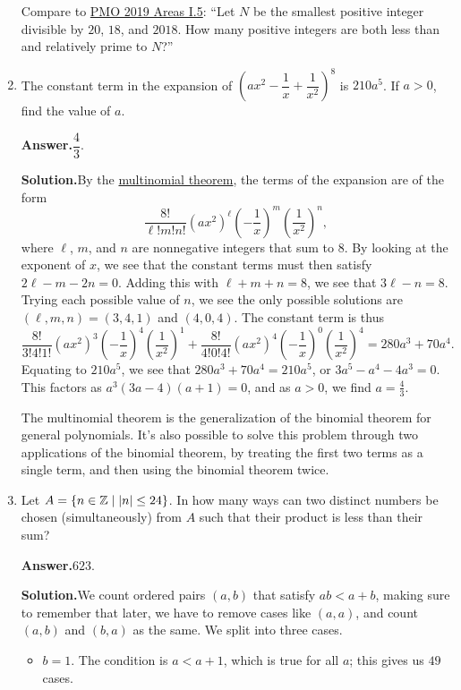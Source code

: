 \documentclass[11pt,paper=letter]{scrartcl}
\newcommand{\ans}{{\sffamily \bfseries Answer.}\;}
\newcommand{\sol}{{\sffamily \bfseries Solution.}\;}
\newcommand{\rem}[1]{{\small \sffamily \sansmath {\bfseries Remark.} #1}}
\begin{document}
\begin{enumerate}[left=0pt]
\rem{Compare to \href{https://cjquines.com/files/pmo2019areas.pdf}{PMO 2019 Areas I.5{}}: ``Let $N$ be the smallest positive integer divisible by $20$, $18$, and $2018$. How many positive integers are both less than and relatively prime to $N$?''}

\item The constant term in the expansion of $\left(ax^2 - \dfrac{1}{x} + \dfrac{1}{x^2}\right)^8$ is $210a^5$. If $a > 0$, find the value of $a$.

\ans $\boxed{\dfrac{4}{3}}$.

\sol By the \href{https://en.wikipedia.org/wiki/Multinomial_theorem}{multinomial theorem{}}, the terms of the expansion are of the form
\[
  \frac{8!}{\ell!m!n!}(ax^2)^\ell\left(-\frac{1}{x}\right)^m\left(\frac{1}{x^2}\right)^n,
\]
where $\ell$, $m$, and $n$ are nonnegative integers that sum to $8$. By looking at the exponent of $x$, we see that the constant terms must then satisfy $2\ell - m - 2n = 0$. Adding this with $\ell + m + n = 8$, we see that $3\ell - n = 8$. Trying each possible value of $n$, we see the only possible solutions are $(\ell, m, n) = (3, 4, 1)$ and $(4, 0, 4)$. The constant term is thus
\[
  \frac{8!}{3!4!1!}(ax^2)^3\left(-\frac{1}{x}\right)^4\left(\frac{1}{x^2}\right)^1 + \frac{8!}{4!0!4!}(ax^2)^4\left(-\frac{1}{x}\right)^0\left(\frac{1}{x^2}\right)^4 = 280a^3 + 70a^4.
\]
Equating to $210a^5$, we see that $280a^3 + 70a^4 = 210a^5$, or $3a^5 - a^4 - 4a^3 =0$. This factors as $a^3(3a - 4)(a + 1) = 0$, and as $a > 0$, we find $a = \frac{4}{3}$.

\rem{The multinomial theorem is the generalization of the binomial theorem for general polynomials. It's also possible to solve this problem through two applications of the binomial theorem, by treating the first two terms as a single term, and then using the binomial theorem twice.}

\item Let $A = \{n \in \mathbb Z \mid \left\lvert n \right\rvert \le 24\}$. In how many ways can two distinct numbers be chosen (simultaneously) from $A$ such that their product is less than their sum?

\ans $\boxed{623}$.

\sol We count ordered pairs $(a, b)$ that satisfy $ab < a + b$, making sure to remember that later, we have to remove cases like $(a, a)$, and count $(a, b)$ and $(b, a)$ as the same. We split into three cases.
\begin{itemize}
  \item $b = 1$. The condition is $a < a + 1$, which is true for all $a$; this gives us $49$ cases.


\end{itemize}
\end{enumerate}
\end{document}
